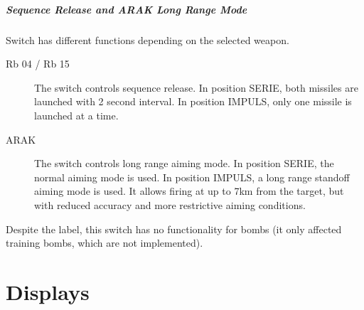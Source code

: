 \documentclass[a4paper]{report}
\begin{document}
{\paragraph{Sequence Release and ARAK Long Range Mode}
Switch  has different functions depending on the selected weapon.
\begin{description}
  \item[Rb 04 / Rb 15] The switch controls sequence release.
    In position SERIE, both missiles are launched with 2 second interval.
    In position IMPULS, only one missile is launched at a time.
  \item[ARAK] The switch controls long range aiming mode.
    In position SERIE, the normal aiming mode is used.
    In position IMPULS, a long range standoff aiming mode is used.
    It allows firing at up to 7km from the target, but with reduced accuracy and more restrictive aiming conditions.
\end{description}
Despite the label, this switch has no functionality for bombs
(it only affected training bombs, which are not implemented).
}



\chapter{Displays}



\end{document}
